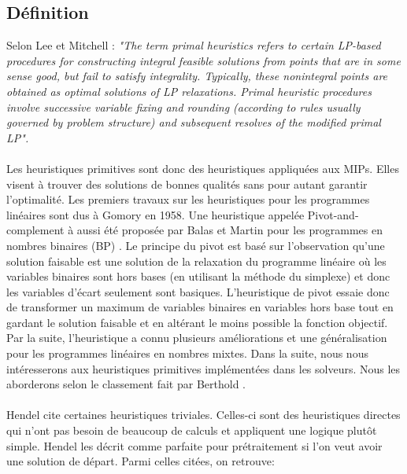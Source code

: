 \documentclass[12pt,a4paper,oneside]{book}
\theoremstyle{definition}
\begin{document}
	\subsection{Définition}
	Selon Lee et Mitchell \cite{Lee2001}: \textit{"The term primal heuristics refers to certain LP-based procedures for constructing integral feasible solutions from points that are in some sense good, but fail to satisfy integrality. Typically, these nonintegral points are obtained as optimal solutions of LP relaxations. Primal heuristic procedures involve successive variable fixing and rounding (according to rules usually governed by problem structure) and subsequent resolves of the 			modified primal LP".}
	\paragraph{}
	Les heuristiques primitives sont donc des heuristiques appliquées aux MIPs. Elles visent à trouver des solutions de bonnes qualités sans pour autant garantir l’optimalité. Les premiers travaux sur les heuristiques pour les programmes linéaires sont dus à Gomory \cite{gomory1958} en 1958. Une heuristique appelée Pivot-and-complement à aussi été proposée par Balas et Martin pour les programmes en nombres binaires (BP) \cite{Balas1980}. Le principe du pivot est basé sur l’observation qu’une solution faisable est une solution de la relaxation du programme linéaire où les variables binaires sont hors bases (en utilisant la méthode du simplexe) et donc les variables d’écart seulement sont basiques. L’heuristique de pivot essaie donc de transformer un maximum de variables binaires en variables hors base tout en gardant le solution faisable et en altérant le moins possible la fonction objectif. Par la suite, l’heuristique a connu plusieurs améliorations et une généralisation pour les programmes linéaires en nombres mixtes. Dans la suite, nous nous intéresserons aux heuristiques primitives implémentées dans les solveurs. Nous les aborderons selon le classement fait par Berthold \cite{berthold2006}.
	
	\paragraph{}
	Hendel \cite{Hendel2011} cite certaines heuristiques triviales. Celles-ci sont des heuristiques directes qui n'ont pas besoin de beaucoup de calculs et appliquent une logique plutôt simple. Hendel les décrit comme parfaite pour prétraitement si l'on veut avoir une solution de départ. Parmi celles citées, on retrouve:
	
\end{document}
